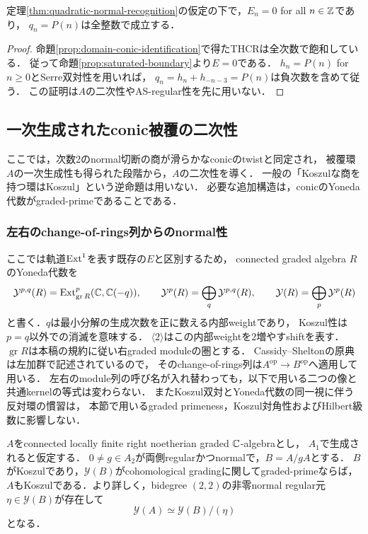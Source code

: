 \documentclass[11pt,a4paper]{ltjsarticle}
\begin{document}
\begin{corollary}[二次境界における全Ext障害の消滅]\label{cor:conic-all-ext-vanishing}
定理\ref{thm:quadratic-normal-recognition}の仮定の下で，$E_n=0$ for all $n\in\mathbb Z$であり，
$q_n=P(n)$は全整数で成立する．
\end{corollary}
\begin{proof}
命題\ref{prop:domain-conic-identification}で得たTHCRは全次数で飽和している．
従って命題\ref{prop:saturated-boundary}より$E=0$である．
$h_n=P(n)$ for $n\geq0$とSerre双対性を用いれば，
$q_n=h_n+h_{-n-3}=P(n)$は負次数を含めて従う．
この証明は$A$の二次性やAS-regular性を先に用いない．
\end{proof}

\subsection{一次生成されたconic被覆の二次性}
\label{sec:conic-cover-koszul}

ここでは，次数2のnormal切断の商が滑らかなconicのtwistと同定され，
被覆環$A$の一次生成性も得られた段階から，$A$の二次性を導く．
一般の「Koszulな商を持つ環はKoszul」という逆命題は用いない．
必要な追加構造は，conicのYoneda代数がgraded-primeであることである．

\subsubsection{左右のchange-of-rings列からのnormal性}

ここでは軌道$\operatorname{Ext}^1$を表す既存の$E$と区別するため，
connected graded algebra $R$のYoneda代数を
\[
 \mathcal Y^{p,q}(R)
 =\operatorname{Ext}^p_{\operatorname{gr}R}(\mathbb C,\mathbb C(-q)),\qquad
 \mathcal Y^p(R)=\bigoplus_q\mathcal Y^{p,q}(R),\qquad
 \mathcal Y(R)=\bigoplus_p\mathcal Y^p(R)
\]
と書く．$q$は最小分解の生成次数を正に数える内部weightであり，
Koszul性は$p=q$以外での消滅を意味する．
$\langle2\rangle$はこの内部weightを$2$増やすshiftを表す．
$\operatorname{gr}R$は本稿の規約に従い右graded moduleの圏とする．
Cassidy--Sheltonの原典は左加群で記述されているので，
そのchange-of-rings列は$A^{\mathrm{op}}\to B^{\mathrm{op}}$へ適用して用いる．
左右のmodule列の呼び名が入れ替わっても，以下で用いる二つの像と共通kernelの等式は変わらない．
またKoszul双対とYoneda代数の同一視に伴う反対環の慣習は，
本節で用いるgraded primeness，Koszul対角性およびHilbert級数に影響しない．

\begin{lemma}
\label{lem:prime-yoneda-lift}
$A$をconnected locally finite right noetherian graded $\mathbb C$-algebraとし，
$A_1$で生成されると仮定する．
$0\ne g\in A_2$が両側regularかつnormalで，$B=A/gA$とする．
$B$がKoszulであり，$\mathcal Y(B)$がcohomological gradingに関してgraded-primeならば，
$A$もKoszulである．より詳しく，bidegree $(2,2)$の非零normal regular元
$\eta\in\mathcal Y(B)$が存在して
\[
 \mathcal Y(A)\simeq\mathcal Y(B)/(\eta)
\]
となる．
\end{lemma}
\end{document}
